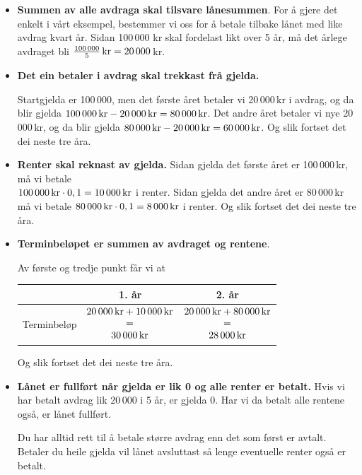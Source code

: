 \begin{itemize}
	\item \textbf{Summen av alle avdraga skal tilsvare lånesummen}.\os
	 For å gjere det enkelt i vårt eksempel, bestemmer vi oss for å betale tilbake lånet med like avdrag kvart år. Sidan 100\,000 kr skal fordelast likt over 5 år, må det årlege avdraget bli $ \frac{100\,000}{5}\,\textrm{kr}=20\,000 $\,kr.
	\item \textbf{Det ein betaler i avdrag skal trekkast frå gjelda.}\os
	
	Startgjelda er 100\,000, men det første året betaler vi 20\,000\,kr i avdrag, og da blir gjelda $100\,000\,\textrm{kr}-20\,000\,\textrm{kr} =80\,000\,\textrm{kr} $. Det andre året betaler vi nye 20\,000\,kr, og da blir gjelda $ 80\,000\,\textrm{kr}-20\,000\,\textrm{kr} =60\,000\,\textrm{kr}  $. Og slik fortset det dei neste tre åra.
	\item \textbf{Renter skal reknast av gjelda.}\os 
	Sidan gjelda det første året er 100\,000\,kr, må vi betale \\${ 100\,000\,\textrm{kr}\cdot0,1=10\,000\,\textrm{kr} } $ i renter. Sidan gjelda det andre året er 80\,000\,kr må vi betale ${ 80\,000\,\textrm{kr}\cdot0,1=8\,000\,\textrm{kr} } $ i renter.  Og slik fortset det dei neste tre åra.
	
	\item \textbf{Terminbeløpet er summen av avdraget og rentene}.\os
	
	Av første og tredje punkt får vi at\os
	\centering
	\begin{tabular}{c| c |c}
		 & 1. år & 2. år \\ \hline
		Terminbeløp 
			& $\begin{matrix}
			20\,000\,\textrm{kr} +10\,000\,\textrm{kr}\\
			= \\
			30\,000\,\textrm{kr}
			\end{matrix} $  
				& $\begin{matrix}
					20\,000\,\textrm{kr} +80\,000\,\textrm{kr}\\
					= \\
					28\,000\,\textrm{kr}
					\end{matrix} $ 
	\end{tabular}\os
\raggedright 
Og slik fortset det dei neste tre åra.
\item \textbf{Lånet er fullført når gjelda er lik 0 og alle renter er betalt.}\os
Hvis vi har betalt avdrag lik 20\,000 i 5 år, er gjelda 0. Har vi da betalt alle rentene også, er lånet fullført. \os

{\footnotesize\mer Du har alltid rett til å betale større avdrag enn det som først er avtalt. Betaler du heile gjelda vil lånet avsluttast så lenge eventuelle renter også er betalt.}
\end{itemize}\vsk
